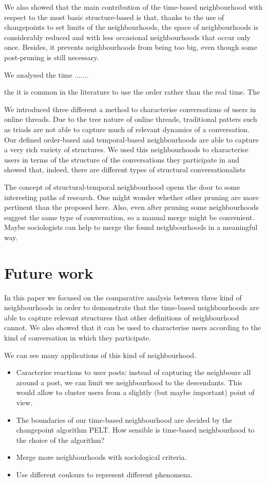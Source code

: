 \documentclass[conference]{IEEEtran}
\begin{document}
We also showed that the main contribution of the time-based neighbourhood with respect to the most basic structure-based is that, thanks to the use of changepoints to set limits of the neighbourhoods, the space of neighbourhoods is considerably reduced and with less occasional neighbourhoods that occur only once. Besides, it prevents neighbourhoods from being too big, even though some post-pruning is still necessary.

We analysed the time .......

 the  it is common in the literature to use the order rather than the real time. The    

We introduced three different  a method to characterise conversations of users in online threads. Due to the tree nature of online threads, traditional patters such as triads are not able to capture much of relevant dynamics of a conversation. Our defined order-based and temporal-based neighbourhoods 
are able to capture a very rich variety of structures. We used this neighbourhoods to characterise users in terms of the structure of the conversations they participate in and showed that, indeed, there are different types of structural conversationalists

The concept of structural-temporal neighbourhood opens the door to some interesting paths of research. One might wonder whether other pruning are more pertinent than the proposed here. Also, even after pruning some neighbourhoods suggest the same type of conversation, so a manual merge might be convenient. Maybe sociologists can help to merge the found neighbourhoods in a meaningful way.   

\section{Future work}
In this paper we focused on the comparative analysis between three kind of neighbourhoods in order to demonstrate that the time-based neighbourhoods are able to capture relevant structures that other definitions of neighbourhood cannot. We also showed that it can be used to characterise users according to the kind of conversation in which they participate.

We can see many applications of this kind of neighbourhood.

\begin{itemize}
\item  Caracterise reactions to user posts: instead of capturing the neighbours all around a post, we can limit we neighbourhood to the descendants. This would allow to cluster users from a slightly (but maybe important) point of view. 
\item The boundaries of our time-based neighbourhood are decided by the changepoint algorithm PELT. How sensible is time-based neighbourhood to the choice of the algorithm?  
\item Merge more neighbourhoods with sociological criteria.
\item Use different coulours to represent different phenomena.
\end{itemize}
\end{document}
